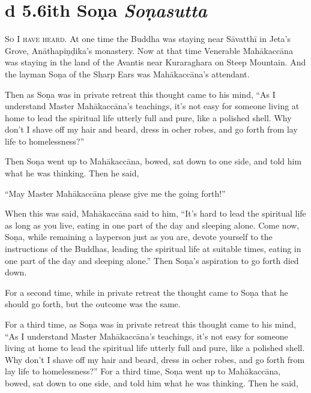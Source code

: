 \documentclass[12pt,openany]{book}%
\newcommand*{\suttatitleacronym}[1]{\smaller[2]{#1}\vspace*{.3em}}
\newcommand*{\suttatitletranslation}[1]{\linebreak{#1}}
\newcommand*{\suttatitleroot}[1]{\linebreak\smaller[2]\itshape{#1}}
\newcommand*{\tocacronym}[1]{\hspace*{-3.3em}{#1}\quad}
\newcommand*{\toctranslation}[1]{#1}
\newcommand*{\tocroot}[1]{(\textit{#1})}
\newcommand*{\scevam}[1]{\textsc{#1}}
\begin{document}
%
\section*{{\suttatitleacronym Ud 5.6}{\suttatitletranslation With Soṇa }{\suttatitleroot Soṇasutta}}
\addcontentsline{toc}{section}{\tocacronym{Ud 5.6} \toctranslation{With Soṇa } \tocroot{Soṇasutta}}

\scevam{So I have heard. }At one time the Buddha was staying near \textsanskrit{Sāvatthī} in Jeta’s Grove, \textsanskrit{Anāthapiṇḍika}’s monastery. Now at that time Venerable \textsanskrit{Mahākaccāna} was staying in the land of the Avantis near Kuraraghara on Steep Mountain. And the layman \textsanskrit{Soṇa} of the Sharp Ears was \textsanskrit{Mahākaccāna}’s attendant. 

Then as \textsanskrit{Soṇa} was in private retreat this thought came to his mind, “As I understand Master \textsanskrit{Mahākaccāna}’s teachings, it’s not easy for someone living at home to lead the spiritual life utterly full and pure, like a polished shell. Why don’t I shave off my hair and beard, dress in ocher robes, and go forth from lay life to homelessness?” 

Then \textsanskrit{Soṇa} went up to \textsanskrit{Mahākaccāna}, bowed, sat down to one side, and told him what he was thinking. Then he said, 

“May Master \textsanskrit{Mahākaccāna} please give me the going forth!” 

When this was said, \textsanskrit{Mahākaccāna} said to him, “It’s hard to lead the spiritual life as long as you live, eating in one part of the day and sleeping alone. Come now, \textsanskrit{Soṇa}, while remaining a layperson just as you are, devote yourself to the instructions of the Buddhas, leading the spiritual life at suitable times, eating in one part of the day and sleeping alone.” Then \textsanskrit{Soṇa}’s aspiration to go forth died down. 

For a second time, while in private retreat the thought came to \textsanskrit{Soṇa} that he should go forth, but the outcome was the same. 

For a third time, as \textsanskrit{Soṇa} was in private retreat this thought came to his mind, “As I understand Master \textsanskrit{Mahākaccāna}’s teachings, it’s not easy for someone living at home to lead the spiritual life utterly full and pure, like a polished shell. Why don’t I shave off my hair and beard, dress in ocher robes, and go forth from lay life to homelessness?” For a third time, \textsanskrit{Soṇa} went up to \textsanskrit{Mahākaccāna}, bowed, sat down to one side, and told him what he was thinking. Then he said, 
\end{document}
